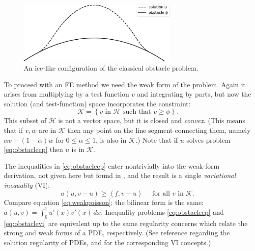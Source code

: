 \documentclass[letterpaper,final,12pt,reqno]{amsart}
\newcommand{\ip}[2]{\left<#1,#2\right>}
\begin{document}
\begin{figure}
\includegraphics[width=0.7\textwidth]{fixfigs/icelike.pdf}
\caption{An ice-like configuration of the classical obstacle problem.}
\label{fig:icelike}
\end{figure}

To proceed with an FE method we need the weak form of the problem.  Again it arises from multiplying by a test function $v$ and integrating by parts, but now the solution (and test-function) space incorporates the constraint:
\begin{equation}
\mathcal{K} = \left\{v \text{ in } \mathcal{H} \text{ such that } v \ge \phi\right\}.  \label{eq:Kdefine}
\end{equation}
This subset of $\mathcal{H}$ is not a vector space, but it is closed and \emph{convex}.  (This means that if $v,w$ are in $\mathcal{K}$ then any point on the line segment connecting them, namely $\alpha v + (1-\alpha) w$ for $0 \le \alpha \le 1$, is also in $\mathcal{K}$.)  Note that if $u$ solves problem \eqref{eq:obstaclecp} then $u$ is in $\mathcal{K}$.

The inequalities in \eqref{eq:obstaclecp} enter nontrivially into the weak-form derivation, not given here but found in \cite{Bueler2021,KinderlehrerStampacchia1980}, and the result is a single \emph{variational inequality} (VI):
\begin{equation}
  a(u,v-u) \ge \ip{f}{v-u} \quad \text{ for all } v \text{ in } \mathcal{K}. \label{eq:obstaclevi}
\end{equation}
Compare equation \eqref{eq:weakpoisson}; the bilinear form is the same: $a(u,v) = \int_0^1 u'(x) v'(x)\,dx$.  Inequality problems \eqref{eq:obstaclecp} and \eqref{eq:obstaclevi} are equivalent up to the same regularity concerns which relate the strong and weak forms of a PDE, respectively.  (See reference \cite{Evans2010} regarding the solution regularity of PDEs, and \cite{KinderlehrerStampacchia1980} for the corresponding VI concepts.)
\end{document}
